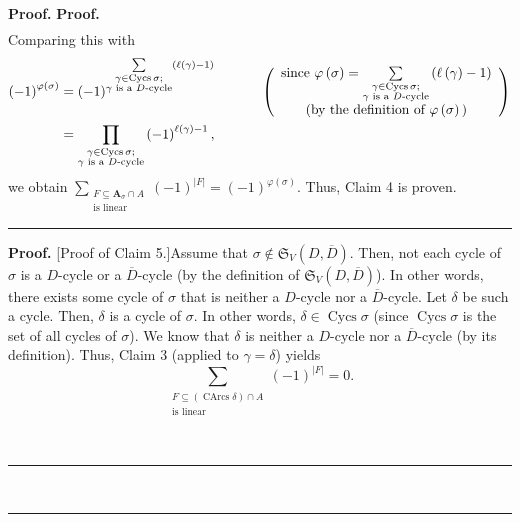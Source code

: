 \documentclass[numbers=enddot,12pt,final,onecolumn,notitlepage]{scrartcl}%
\numberwithin{exer}{section}
\theoremstyle{definition}
\newenvironment{proof}[1][Proof]{\noindent\textbf{#1.} }{\ \rule{0.5em}{0.5em}}
\let\sumnonlimits\sum
\let\prodnonlimits\prod
\renewcommand{\sum}{\sumnonlimits\limits}
\renewcommand{\prod}{\prodnonlimits\limits}
\newenvironment{verlong}{}{}
\begin{document}
\begin{verlong}
\begin{proof}
\begin{proof}
\begin{align*}
\end{align*}
Comparing this with%
\begin{align*}
\left(  -1\right)  ^{\varphi\left(  \sigma\right)  }  &  =\left(  -1\right)
^{\sum_{\substack{\gamma\in\operatorname*{Cycs}\sigma;\\\gamma\text{ is a
}D\text{-cycle}}}\left(  \ell\left(  \gamma\right)  -1\right)  }%
\ \ \ \ \ \ \ \ \ \ \left(
\begin{array}
[c]{c}%
\text{since }\varphi\left(  \sigma\right)  =\sum_{\substack{\gamma
\in\operatorname*{Cycs}\sigma;\\\gamma\text{ is a }D\text{-cycle}}}\left(
\ell\left(  \gamma\right)  -1\right) \\
\text{(by the definition of }\varphi\left(  \sigma\right)  \text{)}%
\end{array}
\right) \\
&  =\prod_{\substack{\gamma\in\operatorname*{Cycs}\sigma;\\\gamma\text{ is a
}D\text{-cycle}}}\left(  -1\right)  ^{\ell\left(  \gamma\right)  -1},
\end{align*}
we obtain $\sum_{\substack{F\subseteq\mathbf{A}_{\sigma}\cap A\\\text{is
linear}}}\left(  -1\right)  ^{\left\vert F\right\vert }=\left(  -1\right)
^{\varphi\left(  \sigma\right)  }$. Thus, Claim 4 is proven.
\end{proof}

\begin{proof}
[Proof of Claim 5.]Assume that $\sigma\notin\mathfrak{S}_{V}\left(
D,\overline{D}\right)  $. Then, not each cycle of $\sigma$ is a $D$-cycle or a
$\overline{D}$-cycle (by the definition of $\mathfrak{S}_{V}\left(
D,\overline{D}\right)  $). In other words, there exists some cycle of $\sigma$
that is neither a $D$-cycle nor a $\overline{D}$-cycle. Let $\delta$ be such a
cycle. Then, $\delta$ is a cycle of $\sigma$. In other words, $\delta
\in\operatorname*{Cycs}\sigma$ (since $\operatorname*{Cycs}\sigma$ is the set
of all cycles of $\sigma$). We know that $\delta$ is neither a $D$-cycle nor a
$\overline{D}$-cycle (by its definition). Thus, Claim 3 (applied to
$\gamma=\delta$) yields%
\begin{equation}
\sum_{\substack{F\subseteq\left(  \operatorname*{CArcs}\delta\right)  \cap
A\\\text{is linear}}}\left(  -1\right)  ^{\left\vert F\right\vert }=0.
\label{pf.prop.linear-in-AsigA.long.c4.pf.5}%
\end{equation}



\end{proof}
\end{proof}
\end{verlong}
\end{document}
